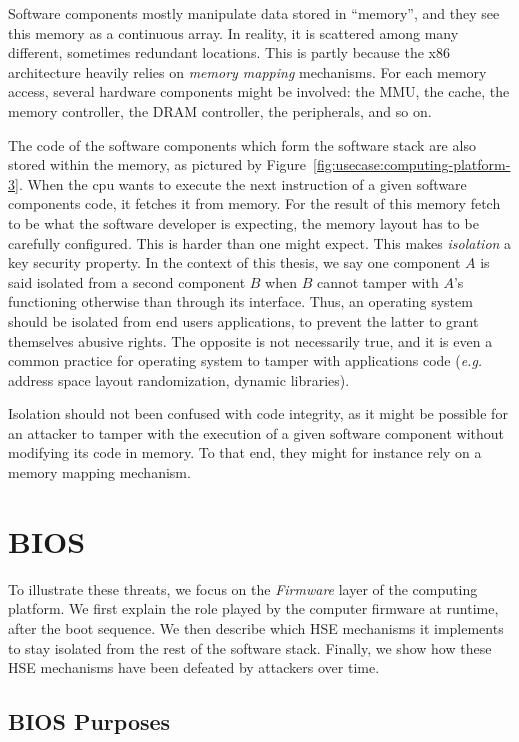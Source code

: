 Software components mostly manipulate data stored in ``memory'', and they see
this memory as a continuous array.
%
In reality, it is scattered among many different, sometimes redundant locations.
%
This is partly because the x86 architecture heavily relies on \emph{memory
  mapping} mechanisms.
%
For each memory access, several hardware components might be involved: the MMU,
the cache, the memory controller, the DRAM controller, the peripherals, and so
on.

The code of the software components which form the software stack are also
stored within the memory, as pictured by
Figure~\ref{fig:usecase:computing-platform-3}.
%
When the \ac{cpu} wants to execute the next instruction of a given software
components code, it fetches it from memory.
%
For the result of this memory fetch to be what the software developer is
expecting, the memory layout has to be carefully configured.
%
This is harder than one might expect.
%
This makes \emph{isolation} a key security property.
%
In the context of this thesis, we say one component $A$ is said isolated from a
second component $B$ when $B$ cannot tamper with $A$'s functioning otherwise
than through its interface.
%
Thus, an operating system should be isolated from end users applications, to
prevent the latter to grant themselves abusive rights.
%
The opposite is not necessarily true, and it is even a common practice for
operating system to tamper with applications code (\emph{e.g.} address space
layout randomization, dynamic libraries).

Isolation should not been confused with code integrity, as it might be possible
for an attacker to tamper with the execution of a given software component
without modifying its code in memory.
%
To that end, they might for instance rely on a memory mapping mechanism.


\section{BIOS}
\label{sec:usecase:firmware}

To illustrate these threats, we focus on the \emph{Firmware} layer of the
computing platform.
%
We first explain the role played by the computer firmware at runtime, after the
boot sequence.
%
We then describe which HSE mechanisms it implements to stay isolated from the
rest of the software stack.
%
Finally, we show how these HSE mechanisms have been defeated by attackers over
time.

\subsection{BIOS Purposes}

